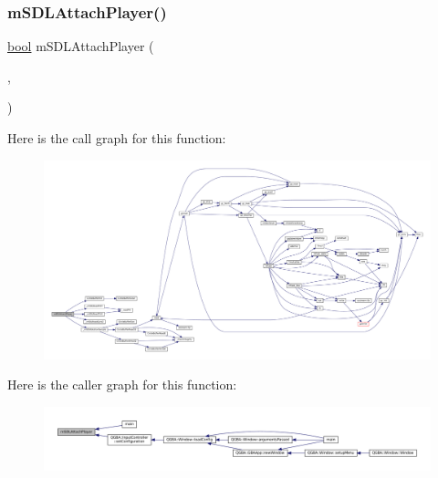 \subsubsection{\texorpdfstring{m\+S\+D\+L\+Attach\+Player()}{mSDLAttachPlayer()}}
{\footnotesize\ttfamily \mbox{\hyperlink{libretro_8h_a4a26dcae73fb7e1528214a068aca317e}{bool}} m\+S\+D\+L\+Attach\+Player (\begin{DoxyParamCaption}\item[{struct \mbox{\hyperlink{sdl-events_8h_structm_s_d_l_events}{m\+S\+D\+L\+Events}} $\ast$}]{,  }\item[{struct \mbox{\hyperlink{sdl-events_8h_structm_s_d_l_player}{m\+S\+D\+L\+Player}} $\ast$}]{ }\end{DoxyParamCaption})}

Here is the call graph for this function\+:
\nopagebreak
\begin{figure}[H]
\begin{center}
\leavevmode
\includegraphics[width=350pt]{sdl-events_8h_a8feb0dd91a28d3788bada7e6ee19d0ad_cgraph}
\end{center}
\end{figure}
Here is the caller graph for this function\+:
\nopagebreak
\begin{figure}[H]
\begin{center}
\leavevmode
\includegraphics[width=350pt]{sdl-events_8h_a8feb0dd91a28d3788bada7e6ee19d0ad_icgraph}
\end{center}
\end{figure}
\mbox{\label{sdl-events_8h_af4ddb8c7e038688031b6635a928ae7fc}} 
